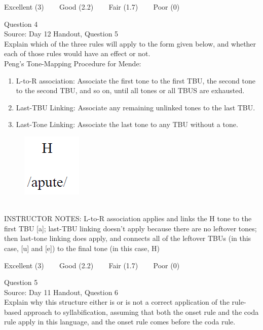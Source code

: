\documentclass[12pt]{article}
\begin{document}
\vfill
Excellent (3) ~~~ Good (2.2) ~~~ Fair (1.7) ~~~ Poor (0)
\newpage

{\large Question 4}\\

Source: Day 12 Handout, Question 5\\

Explain which of the three rules will apply to the form given below, and whether each of those rules would have an effect or not.\\

Peng’s Tone-Mapping Procedure for Mende: \begin{enumerate} \item L-to-R association: Associate the first tone to the first TBU, the second tone to the second TBU, and so on, until all tones or all TBUS are exhausted. \item Last-TBU Linking: Associate any remaining unlinked tones to the last TBU. \item Last-Tone Linking: Associate the last tone to any TBU without a tone. \end{enumerate}

\begin{figure}[H]
\includegraphics{../images/mendetone_b.png}
\end{figure}

~\\
INSTRUCTOR NOTES: L-to-R association applies and links the H tone to the first TBU [a]; last-TBU linking doesn't apply because there are no leftover tones; then last-tone linking does apply, and connects all of the leftover TBUs (in this case, [u] and [e]) to the final tone (in this case, H)


\vfill
Excellent (3) ~~~ Good (2.2) ~~~ Fair (1.7) ~~~ Poor (0)
\newpage

{\large Question 5}\\

Source: Day 11 Handout, Question 6\\

Explain why this structure either is or is not a correct application of the rule-based approach to syllabification, assuming that both the onset rule and the coda rule apply in this language, and the onset rule comes before the coda rule.\\
\end{document}
